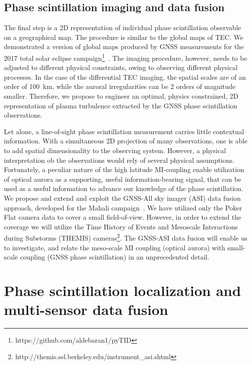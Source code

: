 \documentclass[letterpaper,12pt]{article}
\begin{document}
\vspace{-0.5em}\subsection{Phase scintillation imaging and data fusion}

The final step is a 2D representation of individual phase scintillation observable on a geographical map. The procedure is similar to the global maps of TEC. We demonstrated a version of global maps produced by GNSS measurements for the 2017 total solar eclipse campaign\footnote{https://github.com/aldebaran1/pyTID}~\citep{Mrak2018eclipse, Mrak2018weather}. The imaging procedure, however, needs to be adjusted to different physical constraints, owing to observing different physical processes. In the case of the differential TEC imaging, the spatial scales are of an order of 100~km, while the auroral irregularities can be 2 orders of magnitude smaller. Therefore, we propose to engineer an optimal, physics constrained, 2D representation of plasma turbulence extracted by the GNSS phase scintillation observations.

Let alone, a line-of-sight phase scintillation measurement carries little contextual information. With a simultaneous 2D projection of many observations, one is able to add spatial dimensionality to the observing system. However, a physical interpretation ob the observations would rely of several physical assumptions. Fortunately, a peculiar nature of the high latitude MI-coupling enable utilization of optical aurora as a supporting, useful information-bearing signal, that can be used as a useful information to advance our knowledge of the phase scintillation. We propose and extend and exploit the GNSS-All sky imager (ASI) data fusion approach, developed for the Mahali campaign~\citep{Semeter2017,Mrak2018mahali}. We have utilized only the Poker Flat camera data to cover a small field-of-view. However, in order to extend the coverage we will utilize the Time History of Events and Mesoscale Interactions during Substorms (THEMIS) cameras\footnote{http://themis.ssl.berkeley.edu/instrument\_asi.shtml}. The GNSS-ASI data fusion will enable us to investigate, and relate the meso-scale MI coupling (optical aurora) with small-scale coupling (GNSS phase scintillation) in an unprecedented detail. 


\section{Phase scintillation localization and multi-sensor data fusion}
\end{document}
